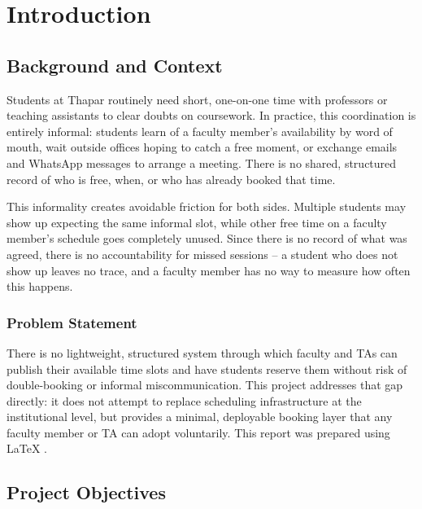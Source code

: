 \documentclass{tietreport}
\author{%
  \texttt{1024170227} Manan Garg \\
  \texttt{1024270355} Vishesh \\
  \texttt{1024170240} Aryan \\
  \texttt{1024170244} Dravinam%
}
\begin{document}
\maketitle
\tableofcontents


\chapter{Introduction}

\section{Background and Context}

Students at Thapar routinely need short, one-on-one time
with professors or teaching assistants to clear doubts on
coursework. In practice, this coordination is entirely
informal: students learn of a faculty member's
availability by word of mouth, wait outside offices
hoping to catch a free moment, or exchange emails and
WhatsApp messages to arrange a meeting. There is no
shared, structured record of who is free, when, or who
has already booked that time.

This informality creates avoidable friction for both
sides. Multiple students may show up expecting the same
informal slot, while other free time on a faculty
member's schedule goes completely unused. Since there is
no record of what was agreed, there is no accountability
for missed sessions -- a student who does not show up
leaves no trace, and a faculty member has no way to
measure how often this happens.

\subsection{Problem Statement}

There is no lightweight, structured system through which
faculty and TAs can publish their available time slots
and have students reserve them without risk of
double-booking or informal miscommunication. This project
addresses that gap directly: it does not attempt to
replace scheduling infrastructure at the institutional
level, but provides a minimal, deployable booking layer
that any faculty member or TA can adopt voluntarily. This
report was prepared using \LaTeX{} \cite{latex2e}.

\section{Project Objectives}
\end{document}
